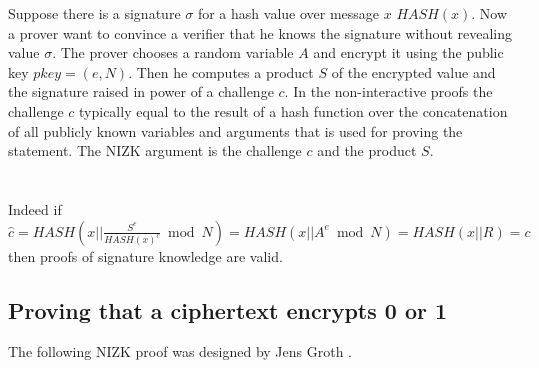Suppose there is a signature $\sigma$ for a hash value over message $x$ $HASH(x)$. Now a prover want to convince a verifier that he knows the signature without revealing value $\sigma$. The prover chooses a random variable $A$ and encrypt it using the public key $pkey = (e,N)$. Then he computes a product $S$ of the encrypted value and the signature raised in power of a challenge $c$. In the non-interactive proofs the challenge $c$ typically equal to the result of a hash function over the concatenation of all publicly known variables and arguments that is used for proving the statement. The NIZK argument is the challenge $c$ and the product $S$.\\\\
\\

Indeed if $\hat{c} = HASH(x|| \frac{S^e}{HASH(x)^c}\bmod N )= HASH(x|| A^e\bmod N ) =  HASH(x||R) = c$ then proofs of signature knowledge are valid.
\subsection{Proving that a ciphertext encrypts 0 or 1}
The following NIZK proof was designed by Jens Groth \cite{Groth2005}. \\

